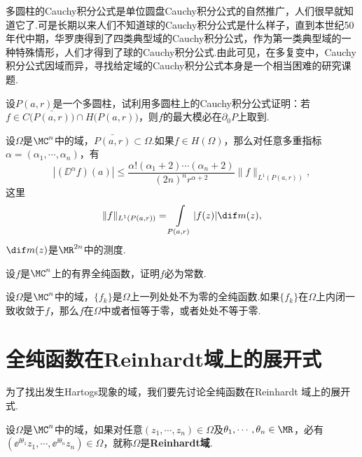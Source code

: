 多圆柱的Cauchy积分公式是单位圆盘Cauchy积分公式的自然推广，人们很早就知道它了.可是长期以来人们不知道球的Cauchy积分公式是什么样子，直到本世纪50年代中期，华罗庚得到了四类典型域的Cauchy积分公式，作为第一类典型域的一种特殊情形，人们才得到了球的Cauchy积分公式.由此可见，在多复变中，Cauchy积分公式因域而异，寻找给定域的Cauchy积分公式本身是一个相当困难的研究课题.
\begin{xiti}
\item 设$P(a,r)$是一个多圆柱，试利用多圆柱上的Cauchy积分公式证明：若$f\in C\big(\bar{P(a,r)}\big)\cap H\big(P(a,r)\big)$，则$f$的最大模必在$\partial_0P$上取到.
\item 设$\Omega$是$\MC^n$中的域，$\bar{P(a,r)}\subset\Omega$.如果$f\in H(\Omega)$，那么对任意多重指标$\alpha=(\alpha_1,\cdots,\alpha_n)$，有
    \[|(\DD^\alpha f)(a)|\le\frac{\alpha!(\alpha_1+2)\cdots(\alpha_n+2)}{(2n)^nr^{\alpha+2}}\|f\|
    _{L^1(P(a,r))},\]
这里
\[\|f\|_{L^1(P(a,r))}=\int\limits_{P(a,r)}|f(z)|\dif m(z),\]
$\dif m(z)$是$\MR^{2n}$中的测度.
\item 设$f$是$\MC^n$上的有界全纯函数，证明$f$必为常数.
\item 设$\Omega$是$\MC^n$中的域，$\{f_k\}$是$\Omega$上一列处处不为零的全纯函数.如果$\{f_k\}$在$\Omega$上内闭一致收敛于$f$，那么$f$在$\Omega$中或者恒等于零，或者处处不等于零.
\end{xiti}

\section{全纯函数在Reinhardt域上的展开式\label{sec9.3}}
为了找出发生Hartogs现象的域，我们要先讨论全纯函数在Reinhardt 域上的展开式.
\begin{definition}\label{def9.3.1}
设$\Omega$是$\MC^n$中的域，如果对任意$(z_1,\cdots,z_n)\in\Omega$及$\theta_1,\cdots,\theta_n\in\MR$，必有$(\ee^{\ii\theta_1}z_1,\cdots,\ee^{\ii\theta_n}z_n)\in\Omega$，就称$\Omega$是\textbf{Reinhardt域}.
\end{definition}

